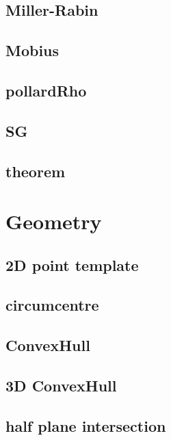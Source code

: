 	\subsection{Miller-Rabin}
		
	\subsection{Mobius}
		
	\subsection{pollardRho}
		
%		
	\subsection{SG}
		
	\subsection{theorem}
		

\section{Geometry}
	\subsection{2D point template}
		
	\subsection{circumcentre}
		
	\subsection{ConvexHull}
		
	\subsection{3D ConvexHull}
		
	\subsection{half plane intersection}
		
